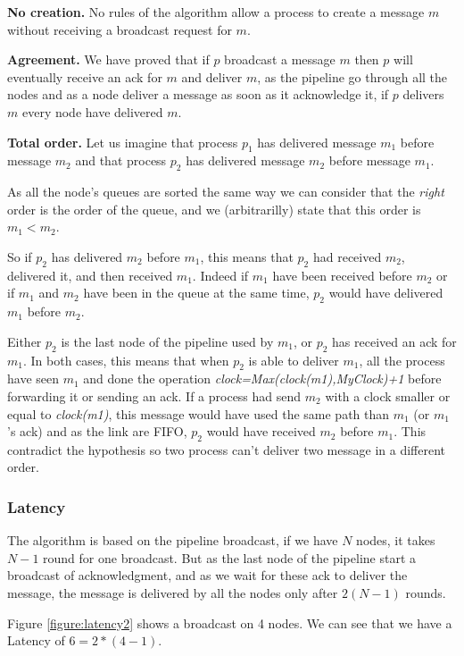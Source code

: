\documentclass[a4paper]{article}
\begin{document}
\bigskip
\noindent\textbf{No creation.} No rules of the algorithm allow a process to
create a message $m$ without receiving a broadcast request for $m$.

\bigskip
\noindent\textbf{Agreement.} We have proved that if $p$ broadcast a message
$m$ then $p$ will eventually receive an ack for $m$ and deliver $m$, as the
pipeline go through all the nodes and as a node deliver a message as soon as
it acknowledge it, if $p$ delivers $m$ every node have delivered $m$.

\bigskip
\noindent\textbf{Total order.} Let us imagine that process $p_1$ has delivered
message $m_1$ before message $m_2$ and that process $p_2$ has delivered
message $m_2$ before message $m_1$.

As all the node's queues are sorted the same way we can consider that the
\textit{right} order is the order of the queue, and we (arbitrarilly) state
that this order is $m_1 < m_2$.

So if $p_2$ has delivered $m_2$ before $m_1$, this means that $p_2$ had
received $m_2$, delivered it, and then received $m_1$. Indeed if $m_1$ have
been received before $m_2$ or if $m_1$ and $m_2$ have been in the queue at the
same time, $p_2$ would have delivered $m_1$ before $m_2$.

Either $p_2$ is the last node of the pipeline used by $m_1$, or $p_2$ has
received an ack for $m_1$. In both cases, this means that when $p_2$ is able
to deliver $m_1$, all the process have seen $m_1$ and done the operation 
\textit{clock=Max(clock(m1),MyClock)+1} before forwarding it or sending an
ack. If a process had send $m_2$ with a clock smaller or equal to
\textit{clock(m1)}, this message would have used the same path than $m_1$
(or $m_1$'s ack) and as the link are FIFO, $p_2$ would have received $m_2$
before $m_1$. This contradict the hypothesis so two process can't deliver two
message in a different order.

\subsubsection{Latency}
The algorithm is based on the pipeline broadcast, if we have $N$ nodes, it takes
$N-1$ round for one broadcast. But as the last node of the pipeline start a
broadcast of acknowledgment, and as we wait for these ack to deliver the
message, the message is delivered by all the nodes only after $2(N-1)$ rounds.

Figure \ref{figure:latency2} shows a broadcast on 4 nodes. We can see that
we have a Latency of $6=2*(4-1)$.
\end{document}
